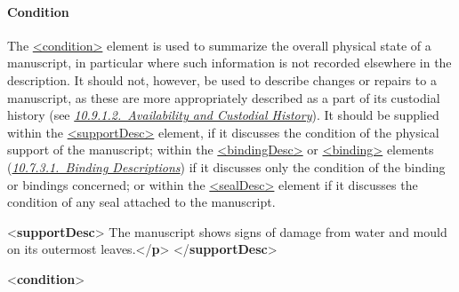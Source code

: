 \paragraph[{Condition}]{Condition}\label{msphco}\par
The \hyperref[TEI.condition]{<condition>} element is used to summarize the overall physical state of a manuscript, in particular where such information is not recorded elsewhere in the description. It should not, however, be used to describe changes or repairs to a manuscript, as these are more appropriately described as a part of its custodial history (see \textit{\hyperref[msadch]{10.9.1.2.\ Availability and Custodial History}}). It should be supplied within the \hyperref[TEI.supportDesc]{<supportDesc>} element, if it discusses the condition of the physical support of the manuscript; within the \hyperref[TEI.bindingDesc]{<bindingDesc>} or \hyperref[TEI.binding]{<binding>} elements (\textit{\hyperref[msphbi]{10.7.3.1.\ Binding Descriptions}}) if it discusses only the condition of the binding or bindings concerned; or within the \hyperref[TEI.sealDesc]{<sealDesc>} element if it discusses the condition of any seal attached to the manuscript.\par\bgroup{}\exampleFont \begin{shaded}\noindent\mbox{}{<\textbf{supportDesc}>}\mbox{}\newline 
{}\mbox{}\newline 
\hspace*{1em}The manuscript shows signs of damage from water and mould on its\mbox{}\newline 
\hspace*{1em}\hspace*{1em}\hspace*{1em}\hspace*{1em} outermost leaves.{</\textbf{p}>}\mbox{}\newline 
{}\mbox{}\newline 
{</\textbf{supportDesc}>}\end{shaded}\egroup\par \par\bgroup{}\exampleFont \begin{shaded}\noindent\mbox{}{<\textbf{condition}>}\mbox{}\newline 

\end{shaded}
